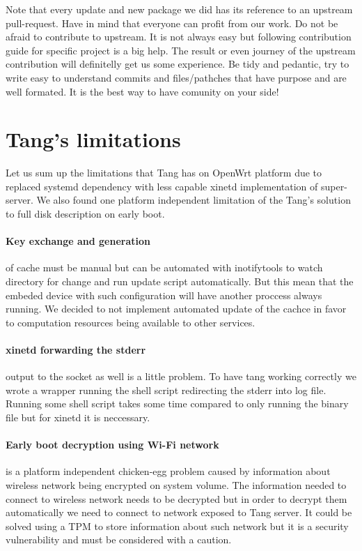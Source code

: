 Note that every update and new package we did has its reference to an upstream pull-request.
Have in mind that everyone can profit from our work.
Do not be afraid to contribute to upstream.
It is not always easy but following contribution guide for specific project is a big help.
The result or even journey of the upstream contribution will definitelly get us some experience.
Be tidy and pedantic, try to write easy to understand commits and files/pathches that have purpose and are well formated.
It is the best way to have comunity on your side!




\section{Tang's limitations}\label{limitations}

Let us sum up the limitations that Tang has on OpenWrt platform due to replaced systemd dependency with less capable xinetd implementation of super-server.
We also found one platform independent limitation of the Tang's solution to full disk description on early boot.

\paragraph{Key exchange and generation} of cache must be manual but  can be automated with inotifytools to watch directory for change and run update script automatically.
But this mean that the embeded device with such configuration will have another proccess always running.
We decided to not implement automated update of the cachce in favor to computation resources being available to other services.

\paragraph{xinetd forwarding the stderr} output to the socket as well is a little problem.
To have tang working correctly we wrote a wrapper running the shell script redirecting the stderr into log file.
Running some shell script takes some time compared to only running the binary file but for xinetd it is neccessary.

\paragraph{Early boot decryption using Wi-Fi network} is a platform independent chicken-egg problem caused by information about wireless network being encrypted on system volume.
The information needed to connect to wireless network needs to be decrypted but in order to decrypt them automatically we need to connect to network exposed to Tang server.
It could be solved using a TPM to store information about such network but it is a security vulnerability and must be considered with a caution.
